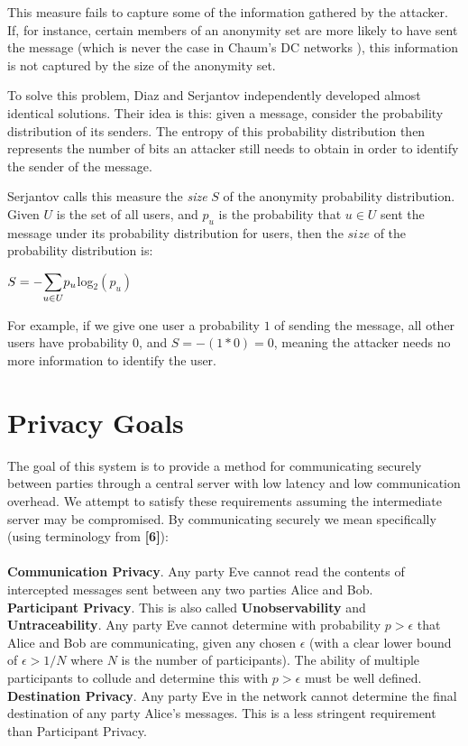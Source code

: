 \documentclass[twocolumn]{paper}
\begin{document}
This measure fails to capture some of the information gathered by the attacker. If, for instance, certain members of an anonymity set are more likely to have sent the message (which is never the case in Chaum's DC networks \cite{chaum-dc}), this information is not captured by the size of the anonymity set. 

To solve this problem, Diaz \cite{Diaz02} and Serjantov \cite{Serj02} independently developed almost identical solutions. Their idea is this: given a message, consider the probability distribution of its senders. The entropy of this probability distribution then represents the number of bits an attacker still needs to obtain in order to identify the sender of the message. 

Serjantov \cite{Serj02} calls this measure the \textit{size} $S$ of the anonymity probability distribution. Given $U$ is the set of all users, and $p_u$ is the probability that $u \in U$ sent the message under its probability distribution for users, then the $size$ of the probability distribution is:

\begin{center}
  $ S = - \mathlarger{\sum}\limits_{u \in U} p_u $log$_2(p_u)$
\end{center}

For example, if we give one user a probability $1$ of sending the message, all other users have probability 0, and $S = -(1 * 0) = 0$, meaning the attacker needs no more information to identify the user. 



\section{Privacy Goals}
The goal of this system is to provide a method for communicating securely between parties through a central server with low latency and low communication overhead. We attempt to satisfy these requirements assuming the intermediate server may be compromised. By communicating securely we mean specifically (using terminology from \textbf{[6]}):
\\\\\textbf{Communication Privacy}. Any party Eve cannot read the contents of intercepted messages sent between any two parties Alice and Bob. 
\\\textbf{Participant Privacy}. This is also called \textbf{Unobservability} and \textbf{Untraceability}. Any party Eve cannot determine with probability $p > \epsilon$ that Alice and Bob are communicating, given any chosen $\epsilon$ (with a clear lower bound of $\epsilon > 1/N$ where $N$ is the number of participants). The ability of multiple participants to collude and determine this with $p > \epsilon$ must be well defined.
\\\textbf{Destination Privacy}. Any party Eve in the network cannot determine the final destination of any party Alice's messages. This is a less stringent requirement than Participant Privacy.
\end{document}
